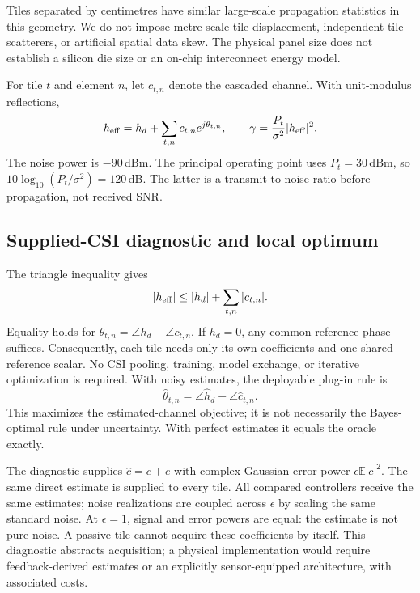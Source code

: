 \documentclass[journal]{IEEEtran}
\begin{document}
Tiles separated by centimetres have similar large-scale propagation statistics in this geometry. We do not impose metre-scale tile displacement, independent tile scatterers, or artificial spatial data skew. The physical panel size does not establish a silicon die size or an on-chip interconnect energy model.

For tile $t$ and element $n$, let $c_{t,n}$ denote the cascaded channel. With unit-modulus reflections,
\begin{equation}
 h_{\rm eff}=h_d+\sum_{t,n}c_{t,n}e^{j\theta_{t,n}},\qquad
 \gamma=\frac{P_t}{\sigma^2}|h_{\rm eff}|^2.
\end{equation}
The noise power is $-90$\,dBm. The principal operating point uses $P_t=30$\,dBm, so $10\log_{10}(P_t/\sigma^2)=120$\,dB. The latter is a transmit-to-noise ratio before propagation, not received SNR.

\subsection{Supplied-CSI diagnostic and local optimum}
The triangle inequality gives
\begin{equation}
 |h_{\rm eff}|\leq |h_d|+\sum_{t,n}|c_{t,n}|.
\end{equation}
Equality holds for $\theta_{t,n}=\angle h_d-\angle c_{t,n}$. If $h_d=0$, any common reference phase suffices. Consequently, each tile needs only its own coefficients and one shared reference scalar. No CSI pooling, training, model exchange, or iterative optimization is required. With noisy estimates, the deployable plug-in rule is
\begin{equation}\label{eq:local}
 \hat\theta_{t,n}=\angle\hat h_d-\angle\hat c_{t,n}.
\end{equation}
This maximizes the estimated-channel objective; it is not necessarily the Bayes-optimal rule under uncertainty. With perfect estimates it equals the oracle exactly.

The diagnostic supplies $\hat c=c+e$ with complex Gaussian error power $\epsilon\mathbb{E}|c|^2$. The same direct estimate is supplied to every tile. All compared controllers receive the same estimates; noise realizations are coupled across $\epsilon$ by scaling the same standard noise. At $\epsilon=1$, signal and error powers are equal: the estimate is not pure noise. A passive tile cannot acquire these coefficients by itself. This diagnostic abstracts acquisition; a physical implementation would require feedback-derived estimates or an explicitly sensor-equipped architecture, with associated costs.
\end{document}
